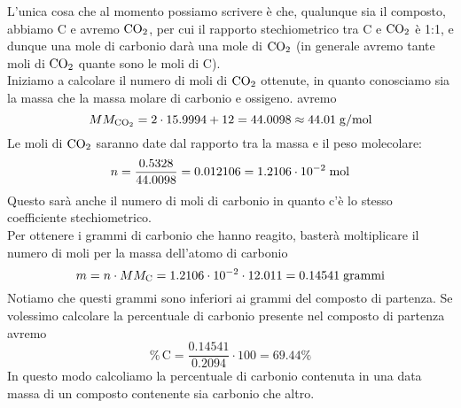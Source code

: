 \begin{soluzione}
    L'unica cosa che al momento possiamo scrivere è che, qualunque sia il composto, abbiamo C e avremo $\rm CO_2$, per cui il rapporto stechiometrico tra C e $\rm CO_2$ è 1:1, e dunque una mole di carbonio darà una mole di $\rm CO_2$ (in generale avremo tante moli di $\rm CO_2$ quante sono le moli di C).\\
    Iniziamo a calcolare il numero di moli di $\rm CO_2$ ottenute, in quanto conosciamo sia la massa che la massa molare di carbonio e ossigeno. avremo
    \begin{equation*}
        MM_{\text{CO}_2}=2 \cdot 15.9994 + 12 = 44.0098 \approx 44.01 \; \rm g/mol
    \end{equation*}
    Le moli di $\rm CO_2$ saranno date dal rapporto tra la massa e il peso molecolare:
    \begin{equation*}
        n=\frac{0.5328}{44.0098}
        =0.012106
        =1.2106 \cdot 10^{-2} \; \rm mol
    \end{equation*}
    Questo sarà anche il numero di moli di carbonio in quanto c'è lo stesso coefficiente stechiometrico.\\
    Per ottenere i grammi di carbonio che hanno reagito, basterà moltiplicare il numero di moli per la massa dell'atomo di carbonio
    \begin{equation*}
        m=n \cdot MM_{\text{C}}
        =1.2106 \cdot 10^{-2} \cdot 12.011
        =0.14541 \; \rm grammi
    \end{equation*}
    Notiamo che questi grammi sono inferiori ai grammi del composto di partenza. Se volessimo calcolare la percentuale di carbonio presente nel composto di partenza avremo
    \begin{equation*}
        \%\,\text{C}
        =\frac{0.14541}{0.2094}\cdot 100
        =69.44 \%
    \end{equation*}
    In questo modo calcoliamo la percentuale di carbonio contenuta in una data massa di un composto contenente sia carbonio che altro.
\end{soluzione}

\newpage

